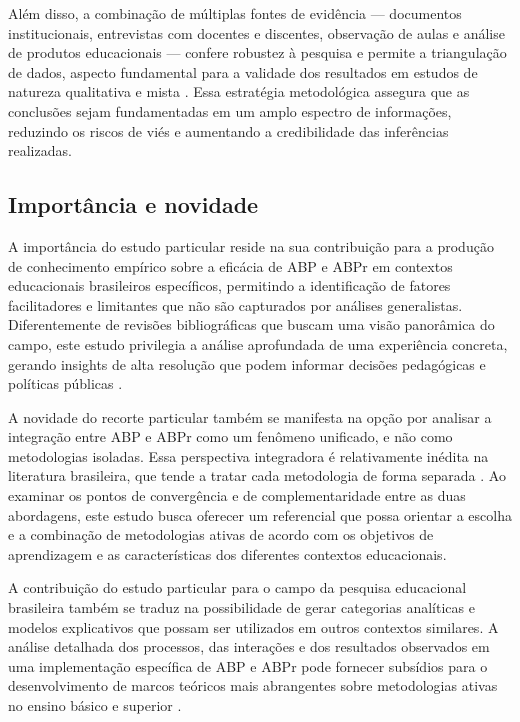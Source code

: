 Além disso, a combinação de múltiplas fontes de evidência — documentos institucionais, entrevistas com docentes e discentes, observação de aulas e análise de produtos educacionais — confere robustez à pesquisa e permite a triangulação de dados, aspecto fundamental para a validade dos resultados em estudos de natureza qualitativa e mista \cite{BARDIN2016}. Essa estratégia metodológica assegura que as conclusões sejam fundamentadas em um amplo espectro de informações, reduzindo os riscos de viés e aumentando a credibilidade das inferências realizadas.

\subsection{Importância e novidade}
\label{subsec:jp_importancia}

A importância do estudo particular reside na sua contribuição para a produção de conhecimento empírico sobre a eficácia de ABP e ABPr em contextos educacionais brasileiros específicos, permitindo a identificação de fatores facilitadores e limitantes que não são capturados por análises generalistas. Diferentemente de revisões bibliográficas que buscam uma visão panorâmica do campo, este estudo privilegia a análise aprofundada de uma experiência concreta, gerando insights de alta resolução que podem informar decisões pedagógicas e políticas públicas \cite{CRESWELL2018}.

A novidade do recorte particular também se manifesta na opção por analisar a integração entre ABP e ABPr como um fenômeno unificado, e não como metodologias isoladas. Essa perspectiva integradora é relativamente inédita na literatura brasileira, que tende a tratar cada metodologia de forma separada \cite{TEODORO2024}. Ao examinar os pontos de convergência e de complementaridade entre as duas abordagens, este estudo busca oferecer um referencial que possa orientar a escolha e a combinação de metodologias ativas de acordo com os objetivos de aprendizagem e as características dos diferentes contextos educacionais.

A contribuição do estudo particular para o campo da pesquisa educacional brasileira também se traduz na possibilidade de gerar categorias analíticas e modelos explicativos que possam ser utilizados em outros contextos similares. A análise detalhada dos processos, das interações e dos resultados observados em uma implementação específica de ABP e ABPr pode fornecer subsídios para o desenvolvimento de marcos teóricos mais abrangentes sobre metodologias ativas no ensino básico e superior \cite{SANTOS2024}.

